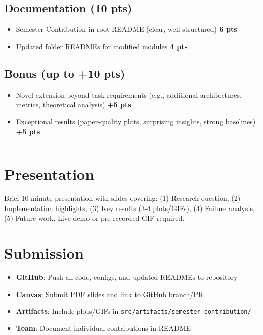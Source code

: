 \documentclass[11pt,a4paper]{scrartcl}
\newcommand{\codepath}[1]{\colorbox{codehighlight}{\texttt{#1}}}
\newcommand{\sectiondivider}{%
  \vspace{0.2em}%
  \noindent\textcolor{rulecolor}{\rule{0.3\textwidth}{0.4pt}}%
  \vspace{0.3em}%
}
\begin{document}
\subsection*{Documentation (10 pts)}
\begin{itemize}[leftmargin=1.4em, itemsep=3pt]
    \item Semester Contribution in root README (clear, well-structured) \dotfill \textbf{6 pts}
    \item Updated folder READMEs for modified modules \dotfill \textbf{4 pts}
\end{itemize}

\subsection*{Bonus (up to +10 pts)}
\begin{itemize}[leftmargin=1.2em, itemsep=3pt]
    \item Novel extension beyond task requirements (e.g., additional architectures, metrics, theoretical analysis) \dotfill \textbf{+5 pts}
    \item Exceptional results (paper-quality plots, surprising insights, strong baselines) \dotfill \textbf{+5 pts}
\end{itemize}

\vspace{1em}

\sectiondivider

\section*{Presentation}

Brief 10-minute presentation with slides covering: (1) Research question, (2) Implementation highlights, (3) Key results (3-4 plots/GIFs), (4) Failure analysis, (5) Future work. Live demo or pre-recorded GIF required.

\vspace{0.5em}

\section*{Submission}

\begin{tcolorbox}[modern]
\begin{itemize}[leftmargin=1.2em, itemsep=4pt]
    \item \textbf{GitHub}: Push all code, configs, and updated READMEs to repository
    \item \textbf{Canvas}: Submit PDF slides and link to GitHub branch/PR
    \item \textbf{Artifacts}: Include plots/GIFs in \codepath{src/artifacts/semester\_contribution/}
    \item \textbf{Team}: Document individual contributions in README
\end{itemize}
\end{tcolorbox}
\end{document}
